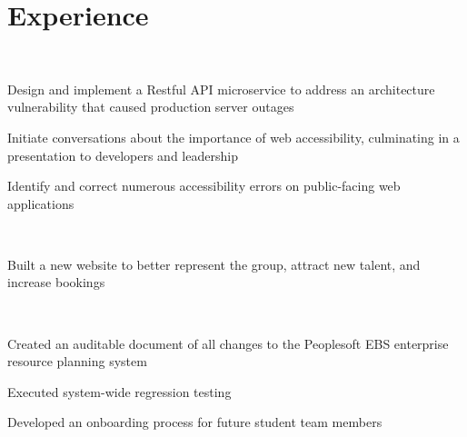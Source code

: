 \documentclass[]{hieudo-build}
\begin{document}
\begin{minipage}[t]{0.62\textwidth} 

\section{Experience}

\\
\vspace{0.9em} %
\begin{tightemize}
\item Design and implement a Restful API microservice to address an architecture vulnerability that caused production server outages
\item Initiate conversations about the importance of web accessibility, culminating in a presentation to developers and leadership
\item Identify and correct numerous accessibility errors on public-facing web applications
\end{tightemize}
\smallsectionsep

 \\
\begin{tightemize}
\item Built a new website to better represent the group, attract new talent, and increase bookings 
\end{tightemize}
\smallsectionsep

 \\
\begin{tightemize}
\item Created an auditable document of all changes to the Peoplesoft EBS enterprise resource planning system
\item Executed system-wide regression testing
\item Developed an onboarding process for future student team members
\end{tightemize}
\sectionsep


\end{minipage}
\end{document}
